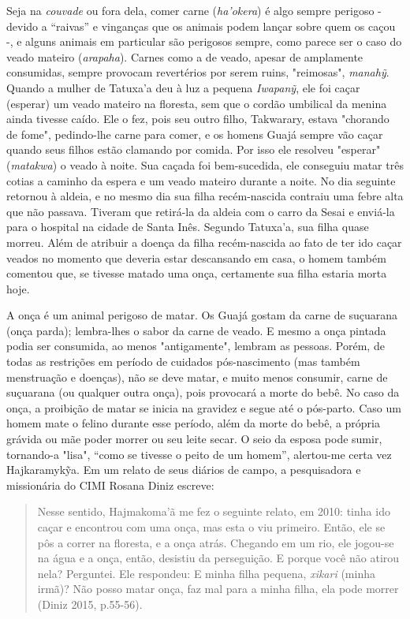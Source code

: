 Seja na \emph{couvade} ou fora dela, comer carne (\emph{ha'okera}) é
algo sempre perigoso - devido a ``raivas'' e vinganças que os animais
podem lançar sobre quem os caçou -, e alguns animais em particular são
perigosos sempre, como parece ser o caso do veado mateiro
(\emph{arapaha}). Carnes como a de veado, apesar de amplamente
consumidas, sempre provocam revertérios por serem ruins, "reimosas",
\emph{manahỹ}. Quando a mulher de Tatuxa'a deu à luz a pequena
\emph{Iwapanỹ}, ele foi caçar (esperar) um veado mateiro na floresta,
sem que o cordão umbilical da menina ainda tivesse caído. Ele o fez,
pois seu outro filho, Takwarary, estava "chorando de fome", pedindo-lhe
carne para comer, e os homens Guajá sempre vão caçar quando seus filhos
estão clamando por comida. Por isso ele resolveu "esperar"
(\emph{matakwa}) o veado à noite. Sua caçada foi bem-sucedida, ele
conseguiu matar três cotias a caminho da espera e um veado mateiro
durante a noite. No dia seguinte retornou à aldeia, e no mesmo dia sua
filha recém-nascida contraiu uma febre alta que não passava. Tiveram que
retirá-la da aldeia com o carro da Sesai e enviá-la para o hospital na
cidade de Santa Inês. Segundo Tatuxa'a, sua filha quase morreu. Além de
atribuir a doença da filha recém-nascida ao fato de ter ido caçar veados
no momento que deveria estar descansando em casa, o homem também
comentou que, se tivesse matado uma onça, certamente sua filha estaria
morta hoje.

A onça é um animal perigoso de matar. Os Guajá gostam da carne de
suçuarana (onça parda); lembra-lhes o sabor da carne de veado. E mesmo a
onça pintada podia ser consumida, ao menos "antigamente", lembram as
pessoas. Porém, de todas as restrições em período de cuidados
pós-nascimento (mas também menstruação e doenças), não se deve matar, e
muito menos consumir, carne de suçuarana (ou qualquer outra onça), pois
provocará a morte do bebê. No caso da onça, a proibição de matar se
inicia na gravidez e segue até o pós-parto. Caso um homem mate o felino
durante esse período, além da morte do bebê, a própria grávida ou mãe
poder morrer ou seu leite secar. O seio da esposa pode sumir, tornando-a
"lisa", ``como se tivesse o peito de um homem'', alertou-me certa vez
Hajkaramykỹa. Em um relato de seus diários de campo, a pesquisadora e
missionária do CIMI Rosana Diniz escreve:

\begin{quote}
Nesse sentido, Hajmakoma'ã me fez o seguinte relato, em 2010: tinha ido
caçar e encontrou com uma onça, mas esta o viu primeiro. Então, ele se
pôs a correr na floresta, e a onça atrás. Chegando em um rio, ele
jogou-se na água e a onça, então, desistiu da perseguição. E porque você
não atirou nela? Perguntei. Ele respondeu: E minha filha pequena,
\emph{xikari} (minha irmã)? Não posso matar onça, faz mal para a minha
filha, ela pode morrer (Diniz 2015, p.55-56).
\end{quote}

